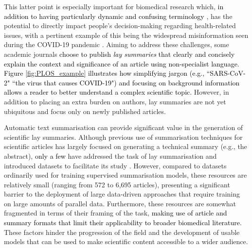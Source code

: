 \documentclass[11pt]{article}
\begin{document}
This latter point is especially important for biomedical research which, \textcolor{black}{in addition to having particularly dynamic and confusing terminology \citep{SMITH2006288,peng2021named}}, has the potential to directly impact people's decision-making regarding health-related issues, with a pertinent example of this being the widespread misinformation seen during the COVID-19 pandemic \citep{Islam2020}.
Aiming to address these challenges, some academic journals 
\textcolor{black}{choose to publish \textit{lay summaries} that
clearly and concisely explain the context and significance of an article using non-specialist language. Figure \ref{fig:PLOS_example} illustrates how simplifying jargon (e.g., ``SARS-CoV-2"  ``the virus that causes COVID-19") and focusing on background information allows a reader to better understand a complex scientific topic.}
However, in addition to placing an extra burden on authors, lay summaries are not yet ubiquitous and focus only on newly published articles.





Automatic text summarisation can provide significant value in the generation of scientific lay summaries. 
Although previous use of summarisation techniques for scientific articles has largely focused on generating a technical summary (e.g., the abstract), \textcolor{black}{only a few} have addressed the task of lay summarisation and introduced datasets to facilitate its study \citep{Chandrasekaran2020-df, Guo2020-ba, Zaman2020-kx}. However, compared to datasets ordinarily used for training supervised summarisation models, these resources are relatively small (ranging from 572 to 6,695 articles), presenting a significant barrier to the deployment of large data-driven approaches that require training on large amounts of parallel data. Furthermore, these resources are somewhat fragmented in terms of their framing of the task, 
\textcolor{black}{making use of article and summary formats that limit their applicability to broader biomedical literature.} 
These factors hinder the progression of the field and the development of usable models that can be used to make scientific content accessible to a wider audience. 
\end{document}
